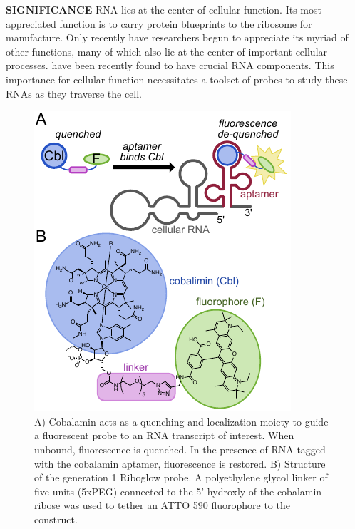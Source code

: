 
\textbf{SIGNIFICANCE}
RNA lies at the center of cellular function. Its most appreciated function is to carry protein blueprints to the ribosome for manufacture. Only recently have researchers begun to appreciate its myriad of other functions, many of which also lie at the center of important cellular processes.\cite{CechNoncodingRNARevolution2014}  have been recently found to have crucial RNA components.
This importance for cellular function necessitates a toolset of probes to study these RNAs as they traverse the cell.

\begin{figure}
\begin{centering}
\includegraphics[width=\textwidth]{figures/fig1v2.pdf}

\end{centering}
\footnotesize
\caption{\label{figure:riboglow}
A) Cobalamin acts as a quenching and localization moiety to guide a fluorescent probe to an RNA transcript of interest. When unbound, fluorescence is quenched. In the presence of RNA tagged with the cobalamin aptamer, fluorescence is restored. B) Structure of the generation 1 Riboglow probe. A polyethylene glycol linker of five units (5xPEG) connected to the 5' hydroxly of the cobalamin ribose was used to tether an ATTO 590 fluorophore to the construct.
}
\end{figure}

